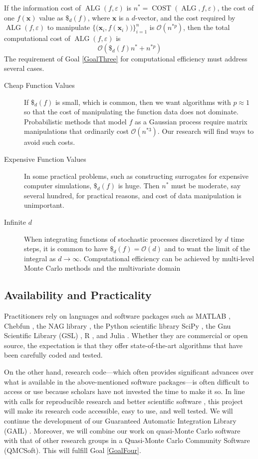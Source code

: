 \documentclass[11pt]{NSFamsart}
\DeclareMathOperator{\cost}{COST}
\DeclareMathOperator{\ALG}{ALG}
\newcommand{\bx}{{\boldsymbol{x}}}
\newcommand{\Order}{\mathcal{O}}
\newcommand{\dataN}{\bigl\{\bigl(\bx_i,f(\bx_i)\bigr)\bigr\}_{i=1}^n}
\begin{document}
If the information cost of $\ALG(f,\varepsilon)$ is $n^* = \cost(\ALG,f,\varepsilon)$, the cost of one $f(\bx)$ value as $\$_d(f)$, where $\bx$ is a $d$-vector, and the cost required by $\ALG(f,\varepsilon)$ to manipulate $\dataN$ is $\Order(n^{*p})$, then the total computational cost of $\ALG(f,\varepsilon)$ is 
\[
 \Order(\$_d(f)n^* + n^{*p})
\]
The requirement of Goal \ref{GoalThree} for computational efficiency must address several cases.  
\begin{description}
    

\item[Cheap Function Values]  If $\$_d(f)$ is small, which is common, then we want algorithms with $p \approx 1$ so that the cost of manipulating the function data does not dominate.  Probabilistic methods that model $f$ as a Gaussian process require matrix manipulations that ordinarily cost $\Order( n^{*3})$.  Our research will find ways to avoid such costs.

    \item[Expensive Function Values] In some practical  problems, such as constructing surrogates for expensive computer simulations,  $\$_d(f)$ is huge.  Then $n^*$ must be moderate, say several hundred, for practical reasons, and cost of data manipulation is unimportant.
    
    \item[Infinite $d$] When integrating functions of stochastic processes discretized by $d$ time steps, it is common to have $\$_d(f) = \Order(d)$ and to want the limit of the integral as $d \to \infty$.  Computational efficiency can be achieved by multi-level Monte Carlo methods and the multivariate domain 
\end{description}

\subsection{Availability and Practicality} \label{sec:AvailPract}

Practitioners rely on languages and software packages such as MATLAB \cite{MAT9.5}, Chebfun \cite{TrefEtal17a}, the NAG library \citep{NAG23}, the Python scientific library SciPy \cite{SCIPY}, the Gnu Scientific Library (GSL) \cite{GSL}, R \cite{R3.5.1_2018}, and Julia \cite{Julia1.0}. Whether they are commercial or open source, the expectation is that they offer state-of-the-art algorithms that have been carefully coded and tested.  

On the other hand, research code---which often provides significant advances over what is available in the above-mentioned software packages---is often difficult to access or use because scholars have not invested the time to make it so.  In line with calls for reproducible research \cite{BaiBor12a, Pen11, Sto14a} and better scientific software \cite{BSS18}, this project will make its research code accessible, easy to use, and well tested.  We will continue the development of our Guaranteed Automatic Integration Library \hypertarget{GAILlink}{(GAIL)} \cite{ChoEtal17b}.  Moreover, we will combine our work on quasi-Monte Carlo software with that of other research groups in a Quasi-Monte Carlo Community Software \hypertarget{QMCSoftlink}{(QMCSoft)}.  This will fulfill Goal \ref{GoalFour}.
\end{document}
